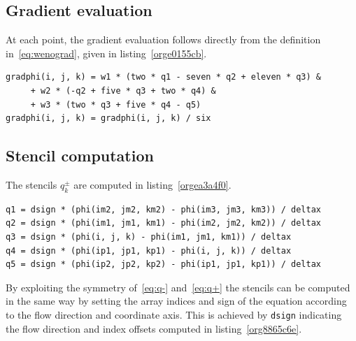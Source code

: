 \documentclass[11pt]{article}
\begin{document}
\subsection{Gradient evaluation}
\label{sec:orgafb6472}

At each point, the gradient evaluation follows directly from the definition in~\eqref{eq:wenograd},
given in listing~\ref{orge0155cb}.

\begin{lstlisting}
gradphi(i, j, k) = w1 * (two * q1 - seven * q2 + eleven * q3) &
     + w2 * (-q2 + five * q3 + two * q4) &
     + w3 * (two * q3 + five * q4 - q5)
gradphi(i, j, k) = gradphi(i, j, k) / six
\end{lstlisting}

\subsection{Stencil computation}
\label{sec:orgd3cc3f9}

The stencils \(q^{\pm}_k\) are computed in listing~\ref{orgea3a4f0}.

\begin{lstlisting}
q1 = dsign * (phi(im2, jm2, km2) - phi(im3, jm3, km3)) / deltax
q2 = dsign * (phi(im1, jm1, km1) - phi(im2, jm2, km2)) / deltax
q3 = dsign * (phi(i, j, k) - phi(im1, jm1, km1)) / deltax
q4 = dsign * (phi(ip1, jp1, kp1) - phi(i, j, k)) / deltax
q5 = dsign * (phi(ip2, jp2, kp2) - phi(ip1, jp1, kp1)) / deltax
\end{lstlisting}

By exploiting the symmetry of~\eqref{eq:q-}
and~\eqref{eq:q+} the stencils can be computed in the same way by setting the array indices and sign
of the equation according to the flow direction and coordinate axis.
This is achieved by \texttt{dsign} indicating the flow direction and index offsets computed in
listing~\ref{org8865c6e}.
\end{document}
